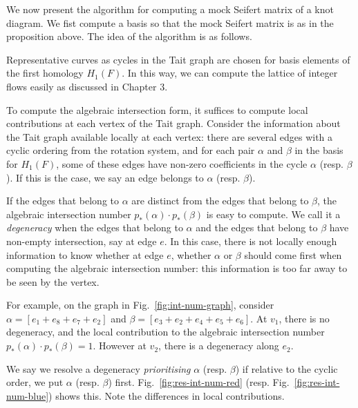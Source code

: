 \documentclass[12pt]{report}
\theoremstyle{upright}
\begin{document}
We now present the algorithm for computing a mock Seifert matrix of a knot diagram. We fist compute a basis so that the mock Seifert matrix is as in the proposition above. The idea of the algorithm is as follows.

Representative curves as cycles in the Tait graph are chosen for basis elements of the first homology $H_{1}(F)$. In this way, we can compute the lattice of integer flows easily as discussed in Chapter 3.

To compute the algebraic intersection form, it suffices to compute local contributions at each vertex of the Tait graph. Consider the information about the Tait graph available locally at each vertex: there are several edges with a cyclic ordering from the rotation system, and for each pair $\alpha$ and $\beta$ in the basis for $H_{1}(F)$, some of these edges have non-zero coefficients in the cycle $\alpha$ (resp. $\beta$). If this is the case, we say an edge belongs to $\alpha$ (resp. $\beta$).

If the edges that belong to $\alpha$ are distinct from the edges that belong to $\beta$, the algebraic intersection number $p_{*}(\alpha) \cdot p_{*}(\beta)$ is easy to compute. We call it a \textit{degeneracy} when the edges that belong to $\alpha$ and the edges that belong to $\beta$ have non-empty intersection, say at edge $e$. In this case, there is not locally enough information to know whether at edge $e$, whether $\alpha$ or $\beta$ should come first when computing the algebraic intersection number: this information is too far away to be seen by the vertex.

For example, on the graph in Fig.~\ref{fig:int-num-graph}, consider $\alpha = [e_{1} + e_{8} + e_{7} + e_{2}]$ and $\beta = [e_{3} + e_{2} + e_{4} + e_{5} + e_{6}]$. At $v_{1}$, there is no degeneracy, and the local contribution to the algebraic intersection number $p_{*}(\alpha) \cdot p_{*}(\beta) = 1$. However at $v_{2}$, there is a degeneracy along $e_{2}$.

We say we resolve a degeneracy \textit{prioritising} $\alpha$ (resp. $\beta$) if relative to the cyclic order, we put $\alpha$ (resp. $\beta$) first. Fig.~\ref{fig:res-int-num-red} (resp. Fig.~\ref{fig:res-int-num-blue}) shows this. Note the differences in local contributions.
\end{document}
